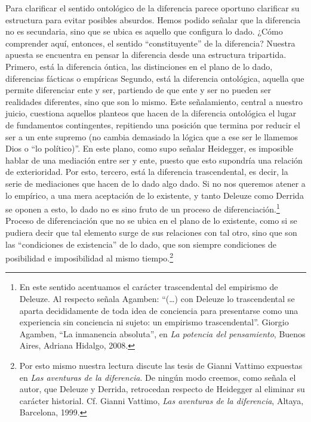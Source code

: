 \documentclass{book}
\begin{document}
Para clarificar el sentido ontológico de la diferencia parece oportuno
clarificar su estructura para evitar posibles absurdos. Hemos podido
señalar que la diferencia no es secundaria, sino que se ubica es aquello
que configura lo dado. ¿Cómo comprender aquí, entonces, el sentido
\enquote{constituyente} de la diferencia? Nuestra apuesta se encuentra en pensar
la diferencia desde una estructura tripartida. Primero, está la
diferencia óntica, las distinciones en el plano de lo dado, diferencias
fácticas o empíricas Segundo, está la diferencia ontológica, aquella que
permite diferenciar ente y ser, partiendo de que ente y ser no pueden
ser realidades diferentes, sino que son lo mismo. Este señalamiento,
central a nuestro juicio, cuestiona aquellos planteos que hacen de la
diferencia ontológica el lugar de fundamentos contingentes, repitiendo
una posición que termina por reducir el ser a un ente supremo (no cambia
demasiado la lógica que a ese ser le llamemos Dios o \enquote{lo político)}. En
este plano, como supo señalar Heidegger, es imposible hablar de una
mediación entre ser y ente, puesto que esto supondría una relación de
exterioridad. Por esto, tercero, está la diferencia trascendental, es
decir, la serie de mediaciones que hacen de lo dado algo dado. Si no nos
queremos atener a lo empírico, a una mera aceptación de lo existente, y
tanto Deleuze como Derrida se oponen a esto, lo dado no es sino fruto de
un proceso de diferenciación.\footnote{En este sentido acentuamos el
  carácter trascendental del empirismo de Deleuze. Al respecto señala
  Agamben: \enquote{(\dots) con Deleuze lo trascendental se aparta
  decididamente de toda idea de conciencia para presentarse como una
  experiencia sin conciencia ni sujeto: un empirismo trascendental}.
  Giorgio Agamben, \enquote{La inmanencia absoluta}, en \emph{La potencia del
  pensamiento}, Buenos Aires, Adriana Hidalgo, 2008.} Proceso de
diferenciación que no se ubica en el plano de lo existente, como si se
pudiera decir que tal elemento surge de sus relaciones con tal otro,
sino que son las \enquote{condiciones de existencia} de lo dado, que son siempre
condiciones de posibilidad e imposibilidad al mismo tiempo.\footnote{Por
  esto mismo nuestra lectura discute las tesis de Gianni Vattimo
  expuestas en \emph{Las aventuras de la diferencia}. De ningún modo
  creemos, como señala el autor, que Deleuze y Derrida, retrocedan
  respecto de Heidegger al eliminar su carácter historial. Cf. Gianni
  Vattimo, \emph{Las aventuras de la diferencia}, Altaya, Barcelona,
  1999.}
\end{document}

